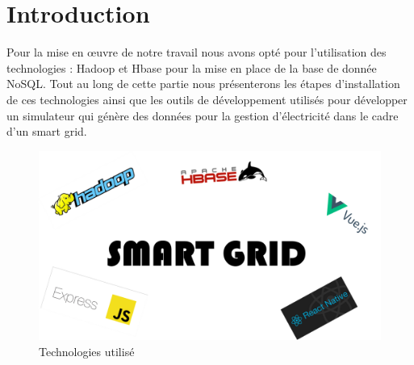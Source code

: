 \section*{Introduction}

Pour la mise en œuvre de notre travail nous avons opté pour l'utilisation des technologies : Hadoop et Hbase pour la mise en place de la base de donnée NoSQL. Tout au long de cette partie nous présenterons les étapes d'installation de ces technologies ainsi que les outils de développement utilisés pour développer un simulateur qui génère des données pour la gestion d'électricité dans le cadre d'un smart grid.

\begin{figure}[h]
	\centering
    \includegraphics[scale=0.6]{img/part3/1.1}
    \caption{Technologies utilisé}
\end{figure}
